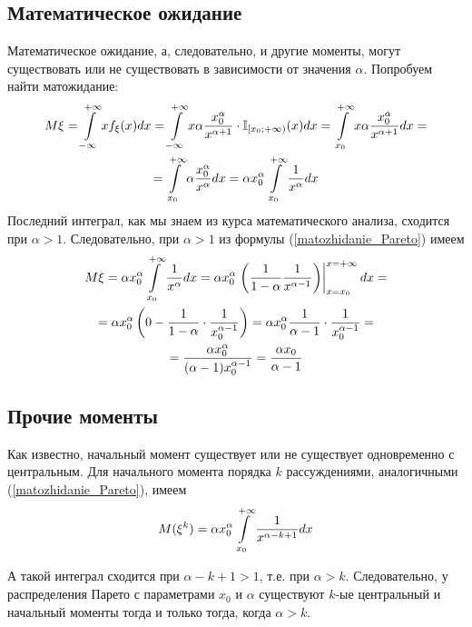 \subsection{Математическое ожидание}
Математическое ожидание, а, следовательно, и другие моменты, могут существовать или не существовать в зависимости от значения $\alpha$.
Попробуем найти матожидание:
\begin{multline}\label{matozhidanie_Pareto}
M\xi=
\int\limits_{-\infty}^{+\infty}x f_\xi(x) dx =
\int\limits_{-\infty}^{+\infty}x \alpha \frac{x_0^\alpha}{x^{\alpha+1}} \cdot \mathbb{I}_{[x_0; +\infty)}(x) dx =
\int\limits_{x_0}^{+\infty}x \alpha\frac{x_0^\alpha}{x^{\alpha+1}} dx =
\\=
\int\limits_{x_0}^{+\infty} \alpha\frac{x_0^\alpha}{x^\alpha} dx = 
\alpha x_0^\alpha \int\limits_{x_0}^{+\infty} \frac{1}{x^\alpha} dx
\end{multline}
Последний интеграл, как мы знаем из курса математического анализа, сходится при $\alpha>1$.
Следовательно, при $\alpha>1$ из формулы (\ref{matozhidanie_Pareto}) имеем
\begin{multline}\label{matozhidanie_Pareto_itog}
M\xi = 
\alpha x_0^\alpha \int\limits_{x_0}^{+\infty} \frac{1}{x^\alpha} dx =
\alpha x_0^\alpha \left.\left(\frac{1}{1-\alpha}\frac{1}{x^{\alpha-1}}\right)\right|_{x=x_0}^{x=+\infty} dx =
\\=
\alpha x_0^\alpha\left(0-\frac{1}{1-\alpha}\cdot\frac{1}{x_0^{\alpha-1}}\right)=
\alpha x_0^\alpha\frac{1}{\alpha-1}\cdot\frac{1}{x_0^{\alpha-1}}=
\\=
\frac{\alpha x_0^\alpha}{(\alpha-1)x_0^{\alpha-1}}=
\frac{\alpha x_0}{\alpha-1}
\end{multline}

\subsection{Прочие моменты}
Как известно, начальный момент существует или не существует одновременно с центральным.
Для начального момента порядка $k$ рассуждениями, аналогичными (\ref{matozhidanie_Pareto}), имеем
\begin{equation}\label{momenty_Pareto}
M(\xi^k)= \alpha x_0^\alpha \int\limits_{x_0}^{+\infty} \frac{1}{x^{\alpha-k+1}} dx
\end{equation}

А такой интеграл сходится при $\alpha-k+1 > 1$, т.е. при $\alpha > k$.
Следовательно, у распределения Парето с параметрами $x_0$ и $\alpha$ существуют $k$-ые центральный и начальный моменты тогда и только тогда, когда $\alpha > k$.

